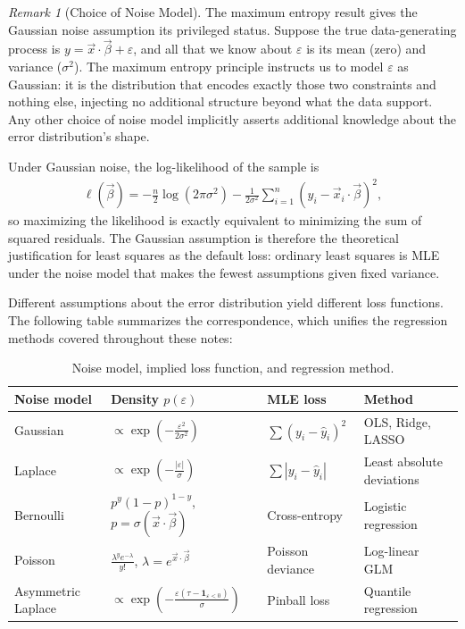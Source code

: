 \documentclass[11pt]{article}
\theoremstyle{definition}
\theoremstyle{plain}
\theoremstyle{remark}
\newtheorem{remark}{Remark}[section]
\begin{document}
\begin{remark}[Choice of Noise Model]
    The maximum entropy result gives the Gaussian noise assumption its privileged status. Suppose the true data-generating process is $y = \vec{x}\cdot\vec{\beta} + \varepsilon$, and all that we know about $\varepsilon$ is its mean (zero) and variance ($\sigma^2$). The maximum entropy principle instructs us to model $\varepsilon$ as Gaussian: it is the distribution that encodes exactly those two constraints and nothing else, injecting no additional structure beyond what the data support. Any other choice of noise model implicitly asserts additional knowledge about the error distribution's shape.

    Under Gaussian noise, the log-likelihood of the sample is
    \begin{align}
        \ell(\vec{\beta}) = -\frac{n}{2}\log(2\pi\sigma^2) - \frac{1}{2\sigma^2}\sum_{i=1}^n(y_i - \vec{x}_i\cdot\vec{\beta})^2,
    \end{align}
    so maximizing the likelihood is exactly equivalent to minimizing the sum of squared residuals. The Gaussian assumption is therefore the theoretical justification for least squares as the default loss: ordinary least squares is MLE under the noise model that makes the fewest assumptions given fixed variance.

    Different assumptions about the error distribution yield different loss functions. The following table summarizes the correspondence, which unifies the regression methods covered throughout these notes:

    \begin{table}[H]
    \centering
    \renewcommand{\arraystretch}{1.3}
    \begin{tabular}{@{}llll@{}}
    \toprule
    \textbf{Noise model} & \textbf{Density} $p(\varepsilon)$ & \textbf{MLE loss} & \textbf{Method} \\
    \midrule
    Gaussian & $\propto \exp\!\left(-\frac{\varepsilon^2}{2\sigma^2}\right)$ & $\sum(y_i - \hat{y}_i)^2$ & OLS, Ridge, LASSO \\
    Laplace & $\propto \exp\!\left(-\frac{|\varepsilon|}{\sigma}\right)$ & $\sum|y_i - \hat{y}_i|$ & Least absolute deviations \\
    Bernoulli & $p^y(1-p)^{1-y}$, $p = \sigma(\vec{x}\cdot\vec{\beta})$ & Cross-entropy & Logistic regression \\
    Poisson & $\frac{\lambda^y e^{-\lambda}}{y!}$, $\lambda = e^{\vec{x}\cdot\vec{\beta}}$ & Poisson deviance & Log-linear GLM \\
    Asymmetric Laplace & $\propto \exp\!\left(-\frac{\varepsilon(\tau - \mathbf{1}_{\varepsilon<0})}{\sigma}\right)$ & Pinball loss & Quantile regression \\
    \bottomrule
    \end{tabular}
    \caption{Noise model, implied loss function, and regression method.}
    \end{table}
\end{remark}
\end{document}
